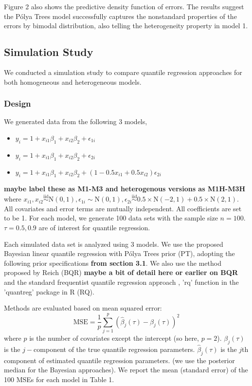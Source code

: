 \documentclass[12pt]{article}
\newcommand{\polya}{P\'{o}lya}
\begin{document}
Figure 2 also shows the predictive density function of errors. The
results suggest the \polya{} Trees model successfully captures the
nonstandard properties of the errors by bimodal distribution, also
telling the heterogeneity property in model 1. 
\subsection{Simulation Study}
We conducted a simulation study to compare quantile regression approaches
for both homogeneous and heterogeneous models. 

\subsubsection{Design}
We generated data from the following 3 models,
\begin{itemize}
\item $y_i = 1 + x_{i1}\beta_1 + x_{i2}\beta_2 + \epsilon_{1i}$
\item $y_i = 1 + x_{i1}\beta_1 + x_{i2}\beta_2 + \epsilon_{2i}$
\item  $y_i = 1 + x_{i1}\beta_1 + x_{i2}\beta_2 +
  (1-0.5x_{i1}+0.5x_{i2}) \epsilon_{2i}$
\end{itemize}
{\bf maybe label these as M1-M3 and heterogenous versions as M1H-M3H}
where $x_{i1} , x_{i2} \stackrel{\text{iid}}{\sim} \mathrm{N}(0,1),
\epsilon_{1i} \sim \mathrm{N}(0,1), \epsilon_{2i} 
\stackrel{\text{iid}}{\sim} 0.5 \times \mathrm{N}(-2,1) + 
0.5 \times \mathrm{N}(2,1)
$. All covariates and error terms are mutually independent. All
coefficients are set to be 1. For each model, we generate 100 data
sets with the sample size $n=100$. $\tau=0.5, 0.9$ are of interest for
quantile regression. 

Each simulated data set is analyzed using 3 models. We use the proposed
Bayesian linear quantile regression with \polya{} Trees prior (PT),
adopting the following prior specifications {\bf from section 3.1}. 
We also use the method proposed by Reich (BQR) {\bf maybe a bit of
  detail here or earlier on BQR} and the
standard frequentist quantile regression approach , 'rq' function in
the 'quantreg' package in R (RQ). 

Methods are evaluated  based on mean squared error: 
\begin{displaymath}
\text{MSE}  = \frac{1}{p} \sum_{j=1}^p (\hat{\beta}_j(\tau) - \beta_j(\tau))^2
\end{displaymath}
where $p$ is the number of covariates except the intercept (so here, $p=2$). $\beta_j(\tau)$ is the
$j-$component of the true quantile regression
parameters. $\hat{\beta}_j(\tau)$ is the  $j$th component of estimated
quantile regression parameters. (we use the posterior median for
the Bayesian approaches). We report the mean (standard error) of the 100
MSEs for each model in Table 1. 
\end{document}
